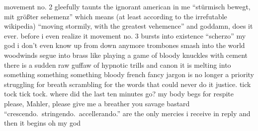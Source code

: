\documentclass[12pt]{article}
\begin{document}
\newline
movement no. 2 gleefully taunts the ignorant american in me\newline
“stürmisch bewegt, mit größter sehemenz” which means\newline
(at least according to the irrefutable wikipedia)\newline
“moving stormily, with the greatest vehemence”\newline
and goddamn, does it ever{}.\newline
\newline
\newline
before i even realize it\newline
movement no. 3 bursts into existence\newline
“scherzo” my god\newline
i don’t even know up from down anymore\newline
trombones smash into the world\newline
woodwinds segue into brass like playing a game of bloody knuckles with cement\newline
there is a sudden raw guffaw of hypnotic trills and canon\newline
it is melting into\newline
something something something\newline
bloody french\newline
fancy jargon is no longer a priority\newline
struggling for breath\newline
scrambling for the words\newline
that could never do it justice{}.\newline
\newline
\newline
tick tock tick tock{}.\newline
where did the last ten minutes go?\newline
my body begs for respite\newline
please, Mahler, please\newline
give me a breather you savage bastard\newline
“crescendo{}.\ stringendo{}.\ accellerando{}.”\newline
are the only mercies i receive in reply\newline
\newline
\newline
and then it begins\newline
oh my god\newline
\end{document}

